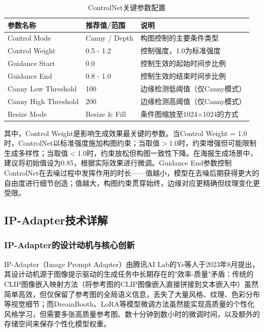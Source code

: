 \documentclass[12pt,a4paper]{ctexart}
\newcommand{\controlnet}{ControlNet}
\newcommand{\ipadapter}{IP-Adapter}
\begin{document}
\begin{table}[H]
\centering
\caption{ControlNet关键参数配置}
\label{tab:controlnet-params}
\begin{tabular}{p{4cm} p{4cm} p{5cm}}
\toprule
\textbf{参数名称} & \textbf{推荐值/范围} & \textbf{说明} \\
\midrule
Control Mode & Canny / Depth & 构图控制的主要条件类型 \\
Control Weight & 0.5 - 1.2 & 控制强度，1.0为标准强度 \\
Guidance Start & 0.0 & 控制生效的起始时间步比例 \\
Guidance End & 0.8 - 1.0 & 控制生效的结束时间步比例 \\
Canny Low Threshold & 100 & 边缘检测低阈值（仅Canny模式） \\
Canny High Threshold & 200 & 边缘检测高阈值（仅Canny模式） \\
Resize Mode & Resize \& Fill & 条件图缩放至1024$\times$1024的方式 \\
\bottomrule
\end{tabular}
\end{table}

其中，Control Weight是影响生成效果最关键的参数。当Control Weight = 1.0时，\controlnet{}以标准强度施加构图约束；当取值$>$1.0时，约束增强但可能限制生成多样性；当取值$<$1.0时，约束放松但构图一致性下降。在海报生成场景中，建议将初始值设为0.85，根据实际效果进行微调。Guidance End参数控制\controlnet{}在去噪过程中发挥作用的时长——值越小，模型在去噪后期获得更大的自由度进行细节创造；值越大，构图约束贯穿始终，边缘对应更精确但纹理变化更受限。

\subsection{IP-Adapter技术详解}

\subsubsection{IP-Adapter的设计动机与核心创新}

\ipadapter{}（Image Prompt Adapter）由腾讯AI Lab的Ye等人于2023年8月提出，其设计动机源于图像提示驱动的生成任务中长期存在的"效率-质量"矛盾：传统的CLIP图像嵌入映射方法（将参考图的CLIP图像嵌入直接拼接到文本嵌入中）虽然简单高效，但仅保留了参考图的全局语义信息，丢失了大量风格、纹理、色彩分布等视觉细节；而DreamBooth、LoRA等模型微调方法虽然能实现高质量的个性化风格学习，但需要多张高质量参考图、数十分钟到数小时的微调时间，以及额外的存储空间来保存个性化模型权重。
\end{document}
